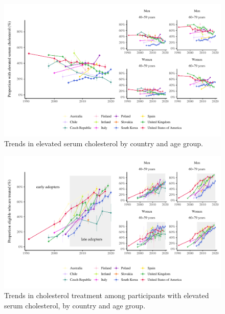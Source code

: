 \documentclass[12pt]{article}
\begin{document}
\begin{refsection}
\begin{landscape}
    \begin{figure}[p]
        \centering
        \includegraphics{../3_figures/eligible.pdf}
        \caption{Trends in elevated serum cholesterol by country and age group.}
        \label{fig:eligible}
    \end{figure}

    \begin{figure}[p]
        \centering
        \includegraphics{../3_figures/treated.pdf}
        \caption{Trends in cholesterol treatment among participants with elevated serum cholesterol, by country and age group.}
        \label{fig:treated}
    \end{figure}


\end{landscape}
\end{refsection}
\end{document}
